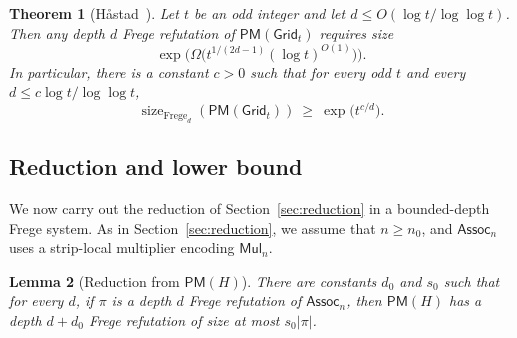 \documentclass[11pt]{article}
\newtheorem{theorem}{Theorem}[section]
\newtheorem{lemma}[theorem]{Lemma}
\theoremstyle{definition}
\theoremstyle{remark}
\newcommand{\Assoc}{\mathsf{Assoc}}
\newcommand{\Mul}{\mathsf{Mul}}
\newcommand{\PM}{\mathsf{PM}}
\newcommand{\Grid}{\mathsf{Grid}}
\newcommand{\sizeF}[1]{\operatorname{size}_{\mathrm{Frege}_{#1}}}
\begin{document}
\begin{theorem}[{H\r{a}stad~\cite[Theorem~5.1]{hastad-php}}]
\label{thm:hastad}
Let $t$ be an odd integer and let \mbox{$d\le O(\log t/\log\log t)$}. Then any depth $d$ Frege refutation of $\PM(\Grid_t)$ requires size
\[
\exp\bigl(\Omega\bigl(t^{1/(2d-1)}(\log t)^{O(1)}\bigr)\bigr).
\]
In particular, there is a constant $c>0$ such that for every odd $t$ and every $d\le c\log t/\log\log t$,
\[
\sizeF{d}(\PM(\Grid_t))\ \ge\ \exp\bigl(t^{c/d}\bigr).
\]
\end{theorem}

\subsection{Reduction and lower bound}
\label{sec:frege-transfer}

We now carry out the reduction of Section~\ref{sec:reduction} in a bounded-depth Frege system. As in Section~\ref{sec:reduction}, we assume that $n\ge n_0$, and $\Assoc_n$ uses a strip-local multiplier encoding $\Mul_n$.

\begin{lemma}[Reduction from $\PM(H)$]
\label{lem:frege-transfer}
There are constants $d_0$ and $s_0$ such that for every $d$, if $\pi$ is a depth $d$ Frege refutation of $\Assoc_n$, then $\PM(H)$ has a depth $d+d_0$ Frege refutation of size at most $s_0|\pi|$.
\end{lemma}
\end{document}

